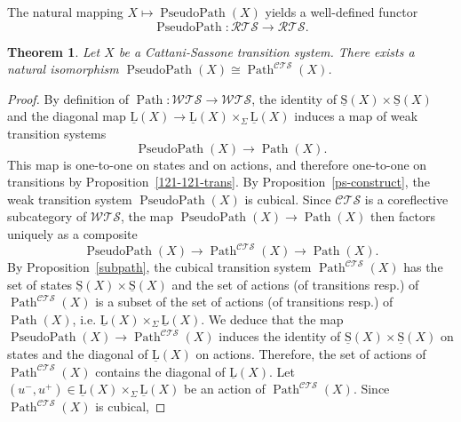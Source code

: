 \documentclass[a4paper,12pt]{amsart}
\newtheorem{thm}{Theorem}[section]
\begin{document}
The natural mapping $X\mapsto \operatorname{{PseudoPath}}(X)$ yields a well-defined
functor \[\operatorname{{PseudoPath}}:{\mathcal{R\!T\!S}} \to {\mathcal{R\!T\!S}}.\]

\begin{thm} \label{path-calcul} Let $X$ be a Cattani-Sassone transition
system. There exists a natural isomorphism $\operatorname{{PseudoPath}}(X) {\cong}
\operatorname{{Path}}^{\mathcal{C\!T\!S}}(X)$.  \end{thm}

\begin{proof} By definition of $\operatorname{{Path}}:{\mathcal{W\!T\!S}} \to {\mathcal{W\!T\!S}}$, the identity of
$\operatorname{\underline{S}}(X)\times \operatorname{\underline{S}}(X)$ and the diagonal map $\operatorname{\underline{L}}(X) \to \operatorname{\underline{L}}(X)\times_\Sigma
\operatorname{\underline{L}}(X)$ induces a map of weak transition systems \[\operatorname{{PseudoPath}}(X) \to
\operatorname{{Path}}(X).\] This map is one-to-one on states and on actions, and
therefore one-to-one on transitions by
Proposition~\ref{121-121-trans}.  By Proposition~\ref{ps-construct},
the weak transition system $\operatorname{{PseudoPath}}(X)$ is cubical. Since ${\mathcal{C\!T\!S}}$ is a
coreflective subcategory of ${\mathcal{W\!T\!S}}$, the map $\operatorname{{PseudoPath}}(X) \to
\operatorname{{Path}}(X)$ then factors uniquely as a composite \[\operatorname{{PseudoPath}}(X) \to
\operatorname{{Path}}^{\mathcal{C\!T\!S}}(X)\to \operatorname{{Path}}(X).\] By Proposition~\ref{subpath}, the
cubical transition system $\operatorname{{Path}}^{\mathcal{C\!T\!S}}(X)$ has the set of states
$\operatorname{\underline{S}}(X)\times \operatorname{\underline{S}}(X)$ and the set of actions (of transitions resp.)  of
$\operatorname{{Path}}^{\mathcal{C\!T\!S}}(X)$ is a subset of the set of actions (of transitions
resp.) of $\operatorname{{Path}}(X)$, i.e. $\operatorname{\underline{L}}(X)\times_\Sigma \operatorname{\underline{L}}(X)$.  We deduce that
the map $\operatorname{{PseudoPath}}(X) \to \operatorname{{Path}}^{\mathcal{C\!T\!S}}(X)$ induces the identity of
$\operatorname{\underline{S}}(X)\times \operatorname{\underline{S}}(X)$ on states and the diagonal of $\operatorname{\underline{L}}(X)$ on actions.
Therefore, the set of actions of $\operatorname{{Path}}^{\mathcal{C\!T\!S}}(X)$ contains the
diagonal of $\operatorname{\underline{L}}(X)$. Let $(u^-,u^+) \in \operatorname{\underline{L}}(X)\times_\Sigma \operatorname{\underline{L}}(X)$ be an
action of $\operatorname{{Path}}^{\mathcal{C\!T\!S}}(X)$. Since $\operatorname{{Path}}^{\mathcal{C\!T\!S}}(X)$ is cubical,

\end{proof}
\end{document}
